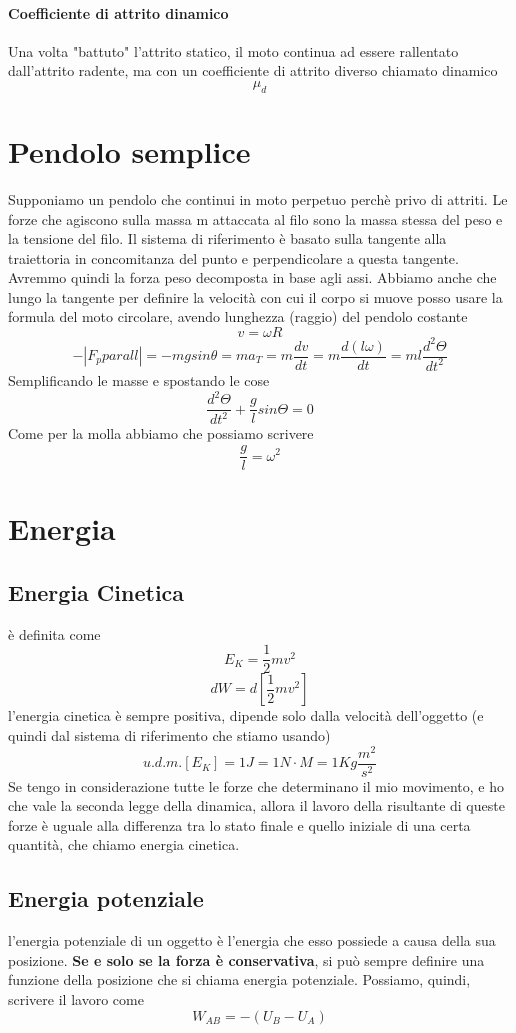 \documentclass[a4paper]{report}
\begin{document}
  \paragraph{Coefficiente di attrito dinamico}
  Una volta "battuto" l'attrito statico, il moto continua ad essere rallentato dall'attrito radente, ma con un coefficiente di attrito diverso chiamato dinamico
  $$ \mu_d $$


  \section{Pendolo semplice}
  Supponiamo un pendolo che continui in moto perpetuo perchè privo di attriti. Le forze che agiscono sulla massa m attaccata al filo sono la massa stessa del peso e la tensione del filo. Il sistema di riferimento è basato sulla tangente alla traiettoria in concomitanza del punto e perpendicolare a questa tangente. Avremmo quindi la forza peso decomposta in base agli assi.
  Abbiamo anche che lungo la tangente per definire la velocità con cui il corpo si muove posso usare la formula del moto circolare, avendo lunghezza (raggio) del pendolo costante
  $$ v = \omega R$$
  $$- |F_pparall| = - mg sin \theta = m a_T = m \frac{dv}{dt} = m \frac{d(l\omega)}{dt} = ml \frac{d^2 \Theta}{dt^2}$$
  Semplificando le masse e spostando le cose
  $$ \frac{d^2\Theta}{dt^2} + \frac{g}{l} sin \Theta = 0 $$
  Come per la molla abbiamo che possiamo scrivere
  $$ \frac{g}{l} = \omega^2$$

  \section{Energia}
  \subsection{Energia Cinetica}
  è definita come
  $$ E_K = \frac{1}{2}m v^2 $$
  $$ dW = d[\frac{1}{2}m v^2] $$
  l'energia cinetica è sempre positiva, dipende solo dalla velocità dell'oggetto (e quindi dal sistema di riferimento che stiamo usando)
  $$ u.d.m.[E_K]= 1J = 1N\cdot M = 1 Kg \frac{m^2}{s^2}$$
  Se tengo in considerazione tutte le forze che determinano il mio movimento, e ho che vale la seconda legge della dinamica, allora il lavoro della risultante di queste forze è uguale alla differenza tra lo stato finale e quello iniziale di una certa quantità, che chiamo energia cinetica.

  \subsection{Energia potenziale}
   l'energia potenziale di un oggetto è l'energia che esso possiede a causa della sua posizione.
   \textbf{Se e solo se la forza è conservativa}, si può sempre definire una funzione della posizione che si chiama energia potenziale.
   Possiamo, quindi, scrivere il lavoro come
  $$ W_{AB} = -(U_B - U_A) $$
\end{document}
